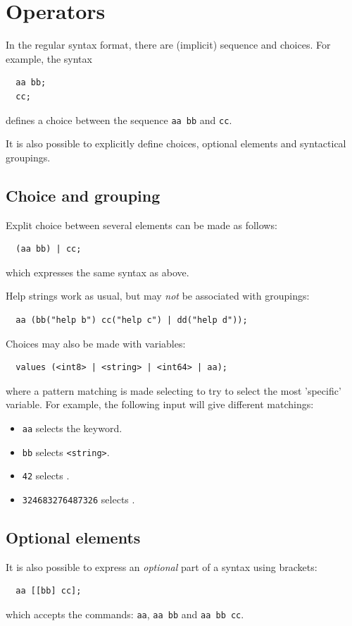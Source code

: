 \documentclass[a4paper, 10pt] {article}
\begin{document}
\section{Operators}
\label{sec:operators}

In the regular syntax format, there are (implicit) sequence and choices. For example, the syntax
\begin{verbatim}
  aa bb;
  cc;
\end{verbatim}
defines a choice between the sequence {\tt aa bb} and {\tt cc}.

It is also possible to explicitly define choices, optional elements and syntactical groupings.

\subsection{Choice and grouping}
Explit choice between several elements can be made as follows:
\begin{verbatim}
  (aa bb) | cc;
\end{verbatim}
which expresses the same syntax as above.

Help strings work as usual, but may \emph{not} be associated with
groupings:
\begin{verbatim}
  aa (bb("help b") cc("help c") | dd("help d"));
\end{verbatim}

Choices may also be made with variables:
\begin{verbatim}
  values (<int8> | <string> | <int64> | aa);
\end{verbatim}

where a pattern matching is made selecting to try to select the most 'specific'
variable. For example, the following input will give different matchings:
\begin{itemize}
\item
{\tt aa} selects the keyword.
\item
{\tt bb} selects {\tt <string>}.
\item
{\tt 42} selects {\tt <int8>}.
\item
{\tt 324683276487326} selects {\tt <int64>}.
\end{itemize} 

\subsection{Optional elements}
It is also possible to express an \emph{optional} part of a syntax
using brackets:
\begin{verbatim}
  aa [[bb] cc];
\end{verbatim}
which accepts the commands: {\tt aa}, {\tt aa bb} and  {\tt aa bb cc}.
\end{document}

